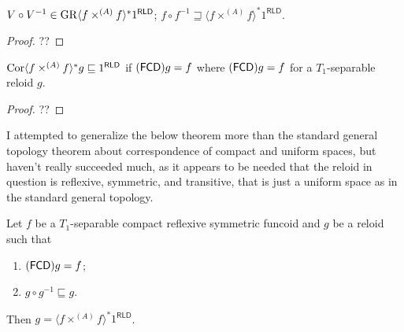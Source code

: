\begin{cor}
  $V \circ V^{- 1} \in \operatorname{GR} \langle f \times^{(A)} f \rangle^{\ast} 1^{\mathsf{RLD}}$; $f
  \circ f^{- 1} \sqsupseteq \langle f \times^{(A)} f \rangle^{\ast} 1^{\mathsf{RLD}}$.
\end{cor}

\begin{proof}
  ??
\end{proof}

\begin{lem}
  $\operatorname{Cor} \langle f \times^{(A)} f \rangle^{\ast} g \sqsubseteq 1^{\mathsf{RLD}}$ if
  $(\mathsf{FCD}) g = f$ where $(\mathsf{FCD}) g = f$ for a
  $T_1$-separable reloid $g$.
\end{lem}

\begin{proof}
  ??
\end{proof}

\begin{rem}
  I attempted to generalize the below theorem more than the standard general
  topology theorem about correspondence of compact and uniform spaces, but
  haven't really succeeded much, as it appears to be needed that the reloid in
  question is reflexive, symmetric, and transitive, that is just a uniform
  space as in the standard general topology.
\end{rem}

\begin{thm}
  Let $f$ be a $T_1$-separable compact 
  reflexive symmetric funcoid and $g$ be a reloid such that
  \begin{enumerate}
    \item $(\mathsf{FCD}) g = f$;
    
    \item $g \circ g^{- 1} \sqsubseteq g$.
  \end{enumerate}
  Then $g = \langle f \times^{(A)} f \rangle^{\ast} 1^{\mathsf{RLD}}$.
\end{thm}

